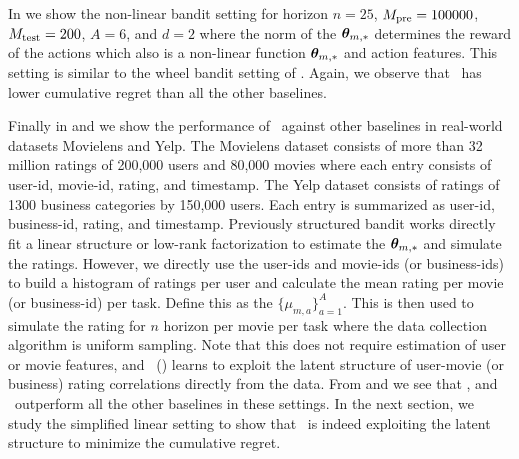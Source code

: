 In  we show the non-linear bandit setting for horizon $n=25$, $M_{\text{pre}} = 100000$, $M_{\text{test}} = 200$, $A=6$, and $d=2$ where the norm of the $\boldsymbol{\theta}_{m,*}$ determines the reward of the actions which also is a non-linear function $\boldsymbol{\theta}_{m,*}$ and action features. This setting is similar to the wheel bandit setting of \citet{riquelme2018deep}. Again, we observe that \pred\ has lower cumulative regret than all the other baselines.

Finally in  and  we show the performance of \pred\ against other baselines in real-world datasets Movielens and Yelp. The Movielens dataset consists of more than 32 million ratings of 200,000 users and 80,000 movies \citep{harper2015movielens} where each entry consists of user-id, movie-id, rating, and timestamp. The Yelp dataset \citep{asghar2016yelp} consists of ratings of 1300 business categories by 150,000 users. Each entry is summarized as user-id, business-id, rating, and timestamp. Previously structured bandit works \citep{deshpande2012linear, hong2023multi} directly fit a linear structure or low-rank factorization to estimate the $\boldsymbol{\theta}_{m,*}$ and simulate the ratings. However, we directly use the user-ids and movie-ids (or business-ids) to build a histogram of ratings per user and calculate the mean rating per movie (or business-id) per task. Define this as the $\{\mu_{m,a}\}_{a=1}^A$. This is then used to simulate the rating for $n$ horizon per movie per task where the data collection algorithm is uniform sampling. 
%
Note that this does not require estimation of user or movie features, and \pred\ (\gt) learns to exploit the latent structure of user-movie (or business) rating correlations directly from the data.
From  and  we see that \pred, and \predt\ outperform all the other baselines in these settings. In the next section, we study the simplified linear setting to show that \pred\ is indeed exploiting the latent structure to minimize the cumulative regret.


